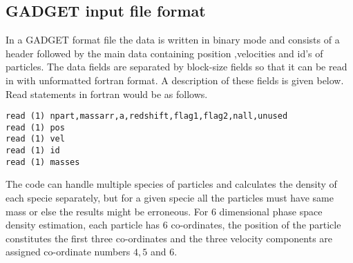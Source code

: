 \documentclass{article}
\begin{document}
\subsection{GADGET input file format}
In a GADGET format file the data is written in binary mode and consists 
of a header followed by the main data containing position 
,velocities and id's of particles. 
The data fields are
separated  by block-size fields so that it can be read in with 
unformatted fortran format. A description of these fields is given below.
Read statements in fortran would be as follows.
\begin{verbatim}
read (1) npart,massarr,a,redshift,flag1,flag2,nall,unused
read (1) pos
read (1) vel
read (1) id
read (1) masses
\end{verbatim}
The code can handle multiple species of particles and calculates the density 
of each specie separately, but for a given specie all the particles must have 
same mass or else the results might be erroneous.
For 6 dimensional phase space density estimation,
each particle has $6$ co-ordinates, the position of the particle 
constitutes the first three co-ordinates and the three velocity 
components are assigned co-ordinate numbers $4,5$ and $6$.
\newpage
\end{document}
